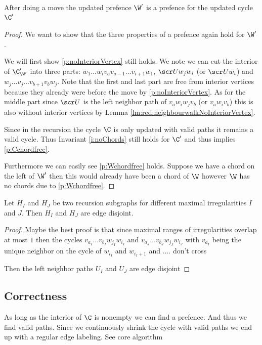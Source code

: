   \begin{lemma}
  After doing a move the updated prefence $\W'$ is a prefence for the updated cycle $\C'$
  \end{lemma}
  \begin{proof}
    We want to show that the three properties of a prefence again hold for $\W'$.

    We will first show \ref{p:noInteriorVertex} still holds.
    We note we can cut the interior of $\C'_{\W'}$ into
    three parts: $w_1 \ldots w_i v_a v_{a-1} \ldots v_{i+1} w_1$, $\U w_j w_i$ (or $\U w_i$) and $w_j \ldots v_j \ldots v_{b+1} v_b w_j$.
    Note that the first and last part are free from interior vertices because they already were before the move by \ref{p:noInteriorVertex}.
    As for the middle part since $\U$ is the left neighbor path of $v_a w_i w_j v_b$ (or $v_a w_i v_b$) this is also without interior vertices by Lemma \ref{lm:red:neighbourwalkNoInteriorVertex}.

    Since in the recursion the cycle $\C$ is only updated with valid paths it remains a valid cycle. Thus Invariant \ref{i:noChords} still holds for $\C'$ and thus implies \ref{p:Cchordfree}.

    Furthermore we can easily see \ref{p:Wchordfree} holds. Suppose we have a chord on the left of $\W'$ then this would already have been a chord of $\W$ however $\W$ has no chords due to \ref{p:Wchordfree}.
  \end{proof}

  \begin{lemma}
  Let $H_I$ and $H_J$ be two recursion subgraphs for different maximal irregularities $I$ and $J$. Then $H_I$ and $H_J$ are edge disjoint.
  \end{lemma}
  \begin{proof}
    Maybe the best proof is that since maximal ranges of irregularities overlap at most $1$ then the cycles $v_{a_I} \ldots v_{b_I} w_{j_I} w_{i_I}$  and  $v_{a_J} \ldots v_{b_J} w_{j_J} w_{i_J}$
    with $v_{a_I}$ being the unique neighbor on the cycle of $w_{i_I}$ and $w_{i_I+1}$ and ....
    don't cross

    Then the left neighbor paths $U_I$ and $U_J$ are edge disjoint


  \end{proof}

\subsection{Correctness}
  As long as the interior of $\C$ is nonempty we can find a prefence. And thus we find valid paths. Since we continuously shrink the cycle with valid paths we end up with a regular edge labeling.
  See core algorithm

